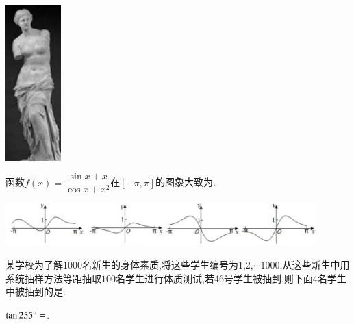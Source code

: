 \documentclass[a4paper]{BHCexam}
\begin{document}
\begin{groups}
\begin{questions}[]
\begin{minipage}{\textwidth}
\fourchoices{$165 cm$}{$175 cm$}{$185 cm$}{$190cm$ }
\begin{center}
\includegraphics[height=6cm]{./TfS0CqW1hu73rFBUg3vAMKOj7dkTVNAt.png}
\vspace{0.5cm}
\end{center}
\begin{solution}{4cm}

\end{solution}
\end{minipage}
\begin{minipage}{\textwidth}
\question[5] 函数$f(x)= \dfrac {\sin x+x}{\cos x+x^{2}}$在$[- \pi  ,  \pi ]$的图象大致为.
\begin{center}
\includegraphics[width=12cm]{./F7UJfg6iYCiCefLftREhksYit6NP46Of.png}
\vspace{0.5cm}
\end{center}
\begin{solution}{4cm}

\end{solution}
\end{minipage}
\begin{minipage}{\textwidth}
\question[5] 某学校为了解$1000$名新生的身体素质,将这些学生编号为$1$,$2$,$ \cdots 1000$,从这些新生中用系统抽样方法等距抽取$100$名学生进行体质测试,若$46$号学生被抽到,则下面$4$名学生中被抽到的是.


\begin{solution}{4cm}

\end{solution}
\end{minipage}
\begin{minipage}{\textwidth}
\question[5] $\tan255^{\small \circ}=$.
\begin{solution}{4cm}


\end{solution}
\end{minipage}
\end{questions}
\end{groups}
\end{document}
